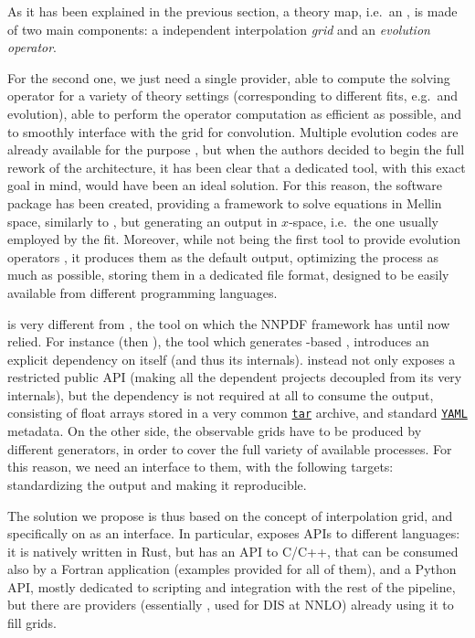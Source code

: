 
As it has been explained in the previous section, a theory map, i.e.\ an
\fktab, is made of two main components: a \pdf independent interpolation
\textit{grid} and an \textit{evolution operator}.

For the second one, we just need a single provider, able to compute the \dglap
solving operator for a variety of theory settings (corresponding to different
\pdf fits, e.g.\ \nlo and \nnlo \qcd evolution), able to perform the
operator computation as efficient as possible, and to smoothly interface with
the grid for convolution.
Multiple evolution codes are already available for the purpose
\cite{Vogt:2004ns,Salam:2008sz,Botje:2010ay,Bertone:2013vaa,Bertone:2017gds},
but when the authors decided to begin the full rework of the architecture, it
has been clear that a dedicated tool, with this exact goal in mind, would have
been an ideal solution.
For this reason, the software package \eko \cite{Candido:2022tld} has been
created, providing a framework to solve \dglap equations in Mellin space,
similarly to \cite{Vogt:2004ns}, but generating an output in $x$-space, i.e.\
the one usually employed by the fit.
Moreover, while not being the first tool to provide evolution operators
\cite{Bertone:2013vaa,Salam:2008sz}, it produces them as the default output,
optimizing the process as much as possible, storing them in a dedicated file
format, designed to be easily available from different programming languages.


\eko is very different from \apfel, the tool on which the NNPDF framework has
until now relied. For instance \apfelgrid (then \apfelcomb), the tool which
generates \apfel-based \fktab, introduces an explicit dependency on \apfel
itself (and thus its internals).
\eko instead not only exposes a restricted public API (making all the dependent
projects decoupled from its very internals), but the dependency is not required
at all to consume the \eko output, consisting of float arrays stored in a very
common \href{https://en.wikipedia.org/wiki/Tar\_(computing)}{\texttt{tar}}
archive, and standard \href{https://yaml.org/}{\texttt{YAML}} metadata.
On the other side, the observable grids have to be produced by different
generators, in order to cover the full variety of available processes.
For this reason, we need an interface to them, with the following targets:
standardizing the output and making it reproducible.

The solution we propose is thus based on the concept of interpolation grid, and
specifically on \pineappl as an interface.
In particular, \pineappl exposes APIs to different languages: it is natively
written in Rust, but has an API to C/C++, that can be consumed also by a
Fortran application (examples provided for all of them), and a Python API,
mostly dedicated to scripting and integration with the rest of the pipeline,
but there are providers (essentially \yadism
\cite{candido_alessandro_2022_6285149}, used for DIS at NNLO) already using it
to fill grids.

